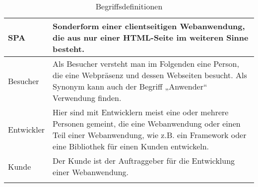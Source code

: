 \begin{longtable}{| p{} | p{} |}
	SPA \index{SPA}& Sonderform einer clientseitigen Webanwendung, die aus nur einer HTML-Seite im weiteren Sinne besteht.\\
	\hline
	
	Besucher \index{Besucher}& Als Besucher versteht man im Folgenden eine Person, die eine Webpräsenz
	und dessen Webseiten besucht. Als Synonym kann auch der Begriff
	„Anwender“ Verwendung finden. 
	
	\\
	\hline
	
	Entwickler\index{Entwickler} & Hier sind mit Entwicklern meist eine oder mehrere Personen gemeint, die eine Webanwendung oder einen Teil einer Webanwendung, wie z.B. ein Framework oder eine Bibliothek  für einen Kunden entwickeln.\\
	\hline
	
	Kunde \index{Kunde}& Der Kunde ist der Auftraggeber für die Entwicklung einer Webanwendung.\\
	\hline

	\caption{Begriffsdefinitionen}\label{tab:definitionen}

\end{longtable}